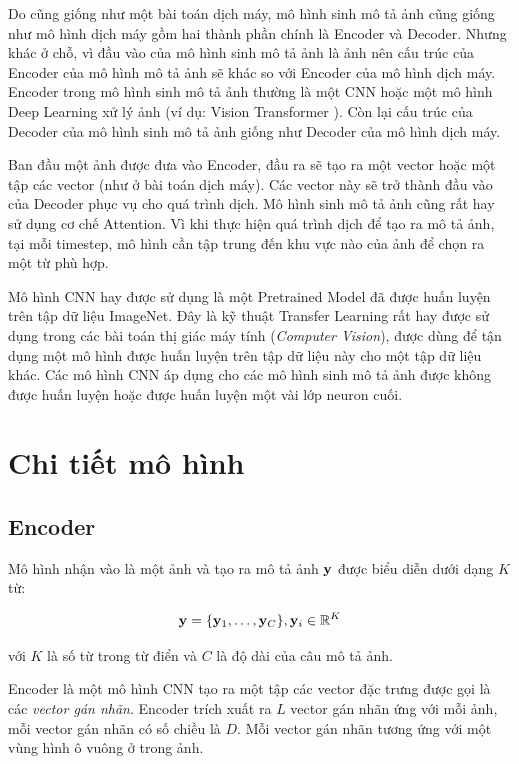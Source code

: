 \documentclass[14pt, a4paper]{article}
\numberwithin{equation}{section}
\numberwithin{algorithm}{section}
\numberwithin{figure}{section}
\numberwithin{dl}{section}
\numberwithin{md}{section}
\numberwithin{bd}{section}
\numberwithin{dn}{section}
\numberwithin{hq}{section}
\begin{document}
    Do cũng giống như một bài toán dịch máy, mô hình sinh mô tả ảnh cũng giống như mô hình dịch máy gồm hai thành phần chính là Encoder và Decoder.
    Nhưng khác ở chỗ, vì đầu vào của mô hình sinh mô tả ảnh là ảnh nên cấu trúc của Encoder của mô hình mô tả ảnh sẽ khác so với Encoder của mô hình dịch máy.
    Encoder trong mô hình sinh mô tả ảnh thường là một CNN hoặc một mô hình Deep Learning xử lý ảnh (ví dụ: Vision Transformer \cite{dosovitskiy2020image}).
    Còn lại cấu trúc của Decoder của mô hình sinh mô tả ảnh giống như Decoder của mô hình dịch máy.

    Ban đầu một ảnh được đưa vào Encoder, đầu ra sẽ tạo ra một vector hoặc một tập các vector (như ở bài toán dịch máy).
    Các vector này sẽ trở thành đầu vào của Decoder phục vụ cho quá trình dịch.
    Mô hình sinh mô tả ảnh cũng rất hay sử dụng cơ chế Attention. 
    Vì khi thực hiện quá trình dịch để tạo ra mô tả ảnh, tại mỗi timestep, mô hình cần tập trung đến khu vực nào của ảnh để chọn ra một từ phù hợp.

    Mô hình CNN hay được sử dụng là một Pretrained Model đã được huấn luyện trên tập dữ liệu ImageNet. 
    Đây là kỹ thuật Transfer Learning rất hay được sử dụng trong các bài toán thị giác máy tính (\textit{Computer Vision}), được dùng để tận dụng một mô hình được huấn luyện trên tập dữ liệu này cho một tập dữ liệu khác.
    Các mô hình CNN áp dụng cho các mô hình sinh mô tả ảnh được không được huấn luyện hoặc được huấn luyện một vài lớp neuron cuối.

    \section{Chi tiết mô hình}

    \subsection{Encoder}

    Mô hình nhận vào là một ảnh và tạo ra mô tả ảnh $\bold{y}$ được biểu diễn dưới dạng $K$ từ:

    \begin{equation}
        \bold{y} = \lbrace \bold{y}_1, \dots, \bold{y}_C \rbrace, \bold{y}_i \in \mathbb{R}^K
    \end{equation}

    với $K$ là số từ trong từ điển và $C$ là độ dài của câu mô tả ảnh.
    
    Encoder là một mô hình CNN tạo ra một tập các vector đặc trưng được gọi là các \textit{vector gán nhãn}.
    Encoder trích xuất ra $L$ vector gán nhãn ứng với mỗi ảnh, mỗi vector gán nhãn có số chiều là $D$.
    Mỗi vector gán nhãn tương ứng với một vùng hình ô vuông ở trong ảnh.
\end{document}
